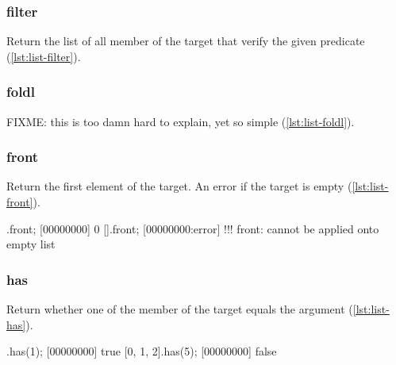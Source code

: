 \subsubsection{filter}

Return the list of all member of the target that verify the given
predicate (\autoref{lst:list-filter}).


\subsubsection{foldl}

FIXME: this is too damn hard to explain, yet so simple
(\autoref{lst:list-foldl}).

\begin{urbiscript}[caption=List.foldl, label=lst:list-foldl, float=\floatposh]

\end{urbiscript}

\subsubsection{front}
\label{sec:std-list-front}

Return the first element of the target. An error if the target is
empty (\autoref{lst:list-front}).

\begin{urbiscript}[caption=List.front, label=lst:list-front, float=\floatposh]
[0, 1, 2].front;
[00000000] 0
[].front;
[00000000:error] !!! front: cannot be applied onto empty list
\end{urbiscript}

\subsubsection{has}

Return whether one of the member of the target equals the argument
(\autoref{lst:list-has}).

\begin{urbiscript}[caption=List.has, label=lst:list-has, float=\floatposh]
[0, 1, 2].has(1);
[00000000] true
[0, 1, 2].has(5);
[00000000] false
\end{urbiscript}

